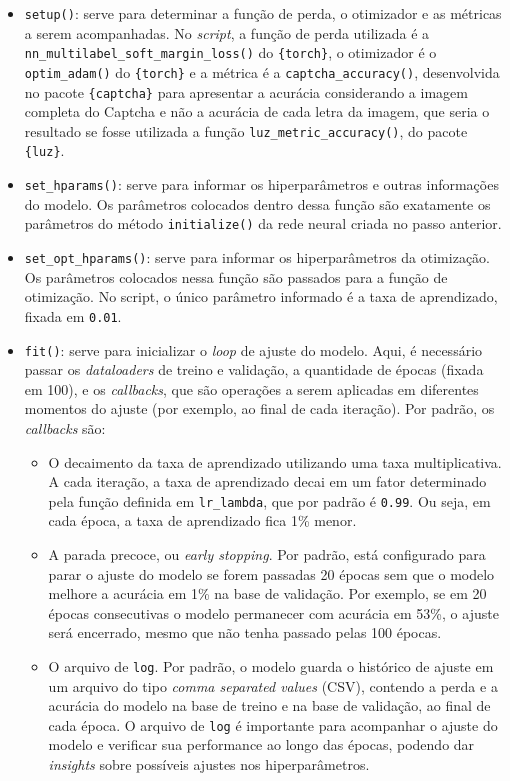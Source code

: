 \documentclass[12pt,twoside,brazilian]{book}
\providecommand{\tightlist}{%
  \setlength{\itemsep}{0pt}\setlength{\parskip}{0pt}}
\begin{document}
\begin{itemize}
\tightlist
\item
  \texttt{setup()}: serve para determinar a função de perda, o
  otimizador e as métricas a serem acompanhadas. No \emph{script}, a
  função de perda utilizada é a
  \texttt{nn\_multilabel\_soft\_margin\_loss()} do \texttt{\{torch\}}, o
  otimizador é o \texttt{optim\_adam()} do \texttt{\{torch\}} e a
  métrica é a \texttt{captcha\_accuracy()}, desenvolvida no pacote
  \texttt{\{captcha\}} para apresentar a acurácia considerando a imagem
  completa do Captcha e não a acurácia de cada letra da imagem, que
  seria o resultado se fosse utilizada a função
  \texttt{luz\_metric\_accuracy()}, do pacote \texttt{\{luz\}}.
\item
  \texttt{set\_hparams()}: serve para informar os hiperparâmetros e
  outras informações do modelo. Os parâmetros colocados dentro dessa
  função são exatamente os parâmetros do método \texttt{initialize()} da
  rede neural criada no passo anterior.
\item
  \texttt{set\_opt\_hparams()}: serve para informar os hiperparâmetros
  da otimização. Os parâmetros colocados nessa função são passados para
  a função de otimização. No script, o único parâmetro informado é a
  taxa de aprendizado, fixada em \texttt{0.01}.
\item
  \texttt{fit()}: serve para inicializar o \emph{loop} de ajuste do
  modelo. Aqui, é necessário passar os \emph{dataloaders} de treino e
  validação, a quantidade de épocas (fixada em 100), e os
  \emph{callbacks}, que são operações a serem aplicadas em diferentes
  momentos do ajuste (por exemplo, ao final de cada iteração). Por
  padrão, os \emph{callbacks} são:

  \begin{itemize}
  \tightlist
  \item
    O decaimento da taxa de aprendizado utilizando uma taxa
    multiplicativa. A cada iteração, a taxa de aprendizado decai em um
    fator determinado pela função definida em \texttt{lr\_lambda}, que
    por padrão é \texttt{0.99}. Ou seja, em cada época, a taxa de
    aprendizado fica 1\% menor.
  \item
    A parada precoce, ou \emph{early stopping}. Por padrão, está
    configurado para parar o ajuste do modelo se forem passadas 20
    épocas sem que o modelo melhore a acurácia em 1\% na base de
    validação. Por exemplo, se em 20 épocas consecutivas o modelo
    permanecer com acurácia em 53\%, o ajuste será encerrado, mesmo que
    não tenha passado pelas 100 épocas.
  \item
    O arquivo de \texttt{log}. Por padrão, o modelo guarda o histórico
    de ajuste em um arquivo do tipo \emph{comma separated values} (CSV),
    contendo a perda e a acurácia do modelo na base de treino e na base
    de validação, ao final de cada época. O arquivo de \texttt{log} é
    importante para acompanhar o ajuste do modelo e verificar sua
    performance ao longo das épocas, podendo dar \emph{insights} sobre
    possíveis ajustes nos hiperparâmetros.
  \end{itemize}
\end{itemize}
\end{document}
